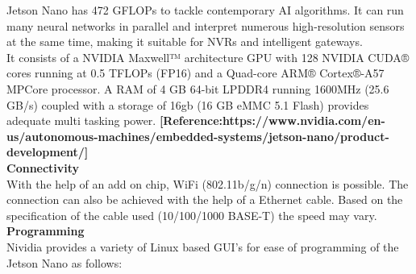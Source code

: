 Jetson Nano has 472 GFLOPs to tackle contemporary AI algorithms. It can run many neural networks in parallel and interpret numerous high-resolution sensors at the same time, making it suitable for NVRs and intelligent gateways.\\
It consists of a NVIDIA Maxwell™ architecture GPU with 128 NVIDIA CUDA® cores running at 0.5 TFLOPs (FP16) and a Quad-core ARM® Cortex®-A57 MPCore processor. A RAM of 4 GB 64-bit LPDDR4 running 1600MHz (25.6 GB/s) coupled with a storage of 16gb (16 GB eMMC 5.1 Flash) provides adequate multi tasking power. \textbf{[Reference:https://www.nvidia.com/en-us/autonomous-machines/embedded-systems/jetson-nano/product-development/]}\\
\textbf{Connectivity}\\
With the help of an add on chip, WiFi (802.11b/g/n) connection is possible. The connection can also be achieved with the help of a Ethernet cable. Based on the specification of the cable used (10/100/1000 BASE-T) the speed may vary.\\
\textbf{Programming}\\
Nividia provides a variety of Linux based GUI's for ease of programming of the Jetson Nano as follows:\\
